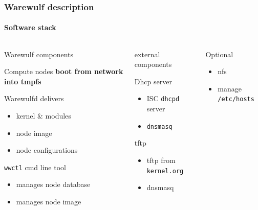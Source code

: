 \documentclass[aspectratio=169]{beamer}
\begin{document}
\begin{frame}[fragile]
\frametitle{Warewulf description}
\framesubtitle{Software stack}
\begin{columns}
  \begin{block}{Warewulf components}
  \hspace*{.1\linewidth}\begin{minipage}{.8\linewidth}
  \begin{block}{Compute nodes}
    \textbf{boot from network into tmpfs}
  \end{block}
  \begin{block}{Warewulfd delivers}
    \begin{itemize}
      \item kernel \& modules
      \item node image
      \item node configurations
    \end{itemize}
  \end{block}
  \begin{block}{\texttt{wwctl} cmd line tool}
    \begin{itemize}
      \item manages node database
      \item manages node image
    \end{itemize}
  \end{block}
  \end{minipage}
  \end{block}
  \begin{block}{external components}
  \hspace*{.1\linewidth}\begin{minipage}{.8\linewidth}
    \begin{block}{Dhcp server}
      \begin{itemize}
      \item ISC \texttt{dhcpd} server
      \item \texttt{dnsmasq}
    \end{itemize}
    \end{block}
    \begin{block}{tftp}
      \begin{itemize}
      \item tftp from \texttt{kernel.org}
      \item dnsmasq
    \end{itemize}
    \end{block}
  \end{minipage} 
  \end{block}
  \begin{block}{Optional}
    \begin{itemize}
      \item nfs
      \item manage \texttt{/etc/hosts}
    \end{itemize}
  \end{block}
\column{2cm}
\end{columns}
\end{frame}
\end{document}
